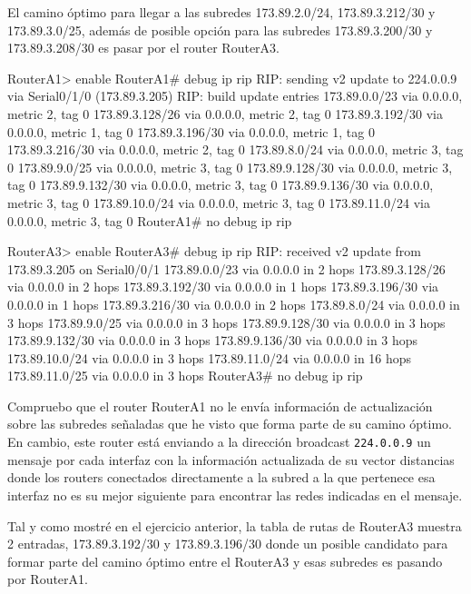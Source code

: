 \par El camino óptimo para llegar a las subredes 173.89.2.0/24, 173.89.3.212/30 y 173.89.3.0/25, además de posible opción para las subredes 173.89.3.200/30 y 173.89.3.208/30 es pasar por el router RouterA3. \\

\begin{listing}[style=consola]
RouterA1> enable
RouterA1# debug ip rip
RIP: sending  v2 update to 224.0.0.9 via Serial0/1/0 (173.89.3.205)
RIP: build update entries
      173.89.0.0/23 via 0.0.0.0, metric 2, tag 0
      173.89.3.128/26 via 0.0.0.0, metric 2, tag 0
      173.89.3.192/30 via 0.0.0.0, metric 1, tag 0
      173.89.3.196/30 via 0.0.0.0, metric 1, tag 0
      173.89.3.216/30 via 0.0.0.0, metric 2, tag 0
      173.89.8.0/24 via 0.0.0.0, metric 3, tag 0
      173.89.9.0/25 via 0.0.0.0, metric 3, tag 0
      173.89.9.128/30 via 0.0.0.0, metric 3, tag 0
      173.89.9.132/30 via 0.0.0.0, metric 3, tag 0
      173.89.9.136/30 via 0.0.0.0, metric 3, tag 0
      173.89.10.0/24 via 0.0.0.0, metric 3, tag 0
      173.89.11.0/24 via 0.0.0.0, metric 3, tag 0
RouterA1# no debug ip rip
\end{listing} 
\begin{listing}[style=consola]
RouterA3> enable
RouterA3# debug ip rip
RIP: received v2 update from 173.89.3.205 on Serial0/0/1
      173.89.0.0/23 via 0.0.0.0 in 2 hops
      173.89.3.128/26 via 0.0.0.0 in 2 hops
      173.89.3.192/30 via 0.0.0.0 in 1 hops
      173.89.3.196/30 via 0.0.0.0 in 1 hops
      173.89.3.216/30 via 0.0.0.0 in 2 hops
      173.89.8.0/24 via 0.0.0.0 in 3 hops
      173.89.9.0/25 via 0.0.0.0 in 3 hops
      173.89.9.128/30 via 0.0.0.0 in 3 hops
      173.89.9.132/30 via 0.0.0.0 in 3 hops
      173.89.9.136/30 via 0.0.0.0 in 3 hops
      173.89.10.0/24 via 0.0.0.0 in 3 hops
      173.89.11.0/24 via 0.0.0.0 in 16 hops
      173.89.11.0/25 via 0.0.0.0 in 3 hops
RouterA3# no debug ip rip
\end{listing} 
\par Compruebo que el router RouterA1 no le envía información de actualización sobre las subredes señaladas que he visto que forma parte de su camino óptimo. En cambio, este router está enviando a la dirección broadcast \texttt{224.0.0.9} un mensaje por cada interfaz con la información actualizada de su vector distancias donde los routers conectados directamente a la subred a la que pertenece esa interfaz no es su mejor siguiente para encontrar las redes indicadas en el mensaje.
\par Tal y como mostré en el ejercicio anterior, la tabla de rutas de RouterA3 muestra 2 entradas, 173.89.3.192/30 y 173.89.3.196/30 donde un posible candidato para formar parte del camino óptimo entre el RouterA3 y esas subredes es pasando por RouterA1.
